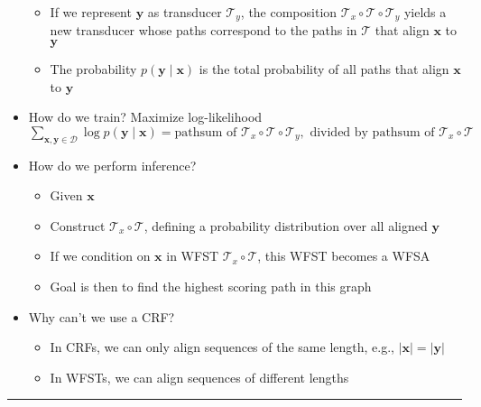 \begin{itemize}
\begin{itemize}
        \item If we represent $\boldsymbol{y}$ as transducer $\mathcal{T}_y$, the composition $\mathcal{T}_x \circ \mathcal{T} \circ \mathcal{T}_y$ yields a new transducer whose paths correspond to the paths in $\mathcal{T}$ that align $\boldsymbol{x}$ to $\boldsymbol{y}$
        \item The probability $p(\boldsymbol{y} \mid \boldsymbol{x})$ is the total probability of all paths that align $\boldsymbol{x}$ to $\boldsymbol{y}$
    \end{itemize}
    \item How do we train? Maximize log-likelihood 
    $\sum_{\boldsymbol{x}, \boldsymbol{y} \in \mathcal{D}} \log p(\boldsymbol{y} \mid \boldsymbol{x}) = \textrm{pathsum of } \mathcal{T}_x \circ \mathcal{T} \circ \mathcal{T}_y, \textrm{ divided by pathsum of } \mathcal{T}_x \circ \mathcal{T}$
    \item How do we perform inference?
    \begin{itemize}
        \item Given $\boldsymbol{x}$
        \item Construct $\mathcal{T}_x \circ \mathcal{T}$, defining a probability distribution over all aligned $\boldsymbol{y}$
        \item If we condition on $\boldsymbol{x}$ in WFST $\mathcal{T}_x \circ \mathcal{T}$, this WFST becomes a WFSA
        \item Goal is then to find the highest scoring path in this graph
    \end{itemize}
    \item Why can't we use a CRF?
    \begin{itemize}
        \item In CRFs, we can only align sequences of the same length, e.g., $|\boldsymbol{x}| = |\boldsymbol{y}|$
        \item In WFSTs, we can align sequences of different lengths
    \end{itemize}
\end{itemize}

{\color{lightgrey}\hrule height 0.001mm}


